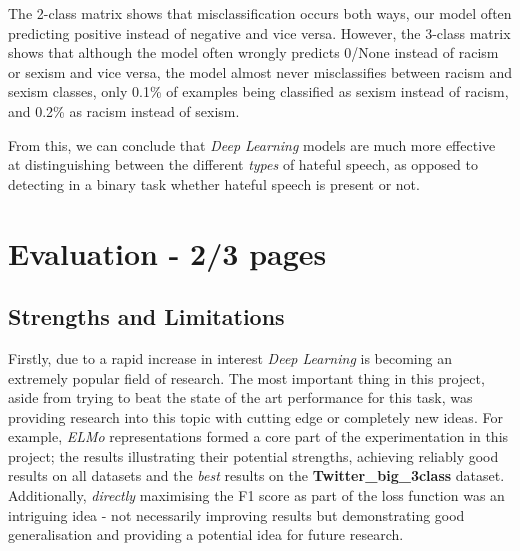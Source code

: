 \documentclass[12pt,a4paper]{article}
\begin{document}
The 2-class matrix shows that misclassification occurs both ways, our model often predicting positive instead of negative and vice versa. However, the 3-class matrix shows that although the model often wrongly predicts 0/None instead of racism or sexism and vice versa, the model almost never misclassifies between racism and sexism classes, only 0.1\% of examples being classified as sexism instead of racism, and 0.2\% as racism instead of sexism.

From this, we can conclude that \textit{Deep Learning} models are much more effective at distinguishing between the different \textit{types} of hateful speech, as opposed to detecting in a binary task whether hateful speech is present or not.


\section{Evaluation - 2/3 pages}

\subsection{Strengths and Limitations}
Firstly, due to a rapid increase in interest \textit{Deep Learning} is becoming an extremely popular field of research. The most important thing in this project, aside from trying to beat the state of the art performance for this task, was providing research into this topic with cutting edge or completely new ideas. For example, \textit{ELMo} representations formed a core part of the experimentation in this project; the results illustrating their potential strengths, achieving reliably good results on all datasets and the \textit{best} results on the \textbf{Twitter\_big\_3class} dataset. Additionally, \textit{directly} maximising the F1 score as part of the loss function was an intriguing idea - not necessarily improving results but demonstrating good generalisation and providing a potential idea for future research.
\end{document}
